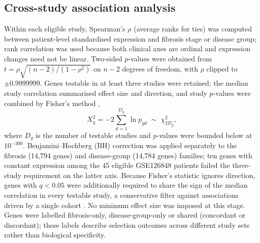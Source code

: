 \documentclass[11pt,a4paper]{article}
\begin{document}
\subsection*{Cross-study association analysis}
Within each eligible study, Spearman's $\rho$ (average ranks for ties) was computed between patient-level standardised expression and fibrosis stage or disease group; rank correlation was used because both clinical axes are ordinal and expression changes need not be linear. Two-sided $p$-values were obtained from $t=\rho\sqrt{(n-2)/(1-\rho^2)}$ on $n-2$ degrees of freedom, with $\rho$ clipped to $\pm0.9999999$. Genes testable in at least three studies were retained; the median study correlation summarised effect size and direction, and study $p$-values were combined by Fisher's method \cite{fisher1925},
\begin{equation}
X_g^2=-2\sum_{d=1}^{D_g}\ln p_{gd}\;\sim\;\chi^2_{2D_g},
\end{equation}
where $D_g$ is the number of testable studies and $p$-values were bounded below at $10^{-300}$. Benjamini--Hochberg (BH) correction \cite{benjamini1995} was applied separately to the fibrosis (14,794 genes) and disease-group (14,784 genes) families; ten genes with constant expression among the 45 eligible GSE126848 patients failed the three-study requirement on the latter axis. Because Fisher's statistic ignores direction, genes with $q<0.05$ were additionally required to share the sign of the median correlation in every testable study, a conservative filter against associations driven by a single cohort \cite{sweeney2017}. No minimum effect size was imposed at this stage. Genes were labelled fibrosis-only, disease-group-only or shared (concordant or discordant); these labels describe selection outcomes across different study sets rather than biological specificity.
\end{document}
